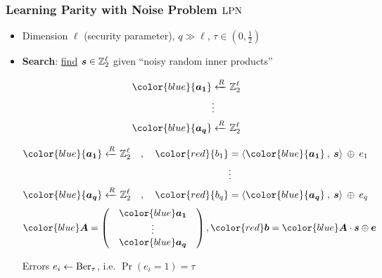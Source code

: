 \begin{frame}
\frametitle{Learning Parity with Noise Problem $\mathrm{LPN}$}
\begin{itemize}[<+->]
 \item Dimension $\ell$ (security parameter), $q \gg \ell$, $\tau \in \left( 0,\frac{1}{2} \right)$
 \vspace*{5pt}
 \item \textbf{Search}: \underline{find}  $ \boldsymbol{s} \in \mathbb{Z}_2^{\ell}$ given ``noisy random inner products'' \\
 \begin{overprint}
  \begin{align*}
  {\color{blue}{\vect{a_1}}} & \R \zol \quad   \\
   & \vdots \\
   {\color{blue}{\vect{a_q}}} & \R \zol \quad   \\
  \end{align*}


  \begin{align*}
  {\color{blue}{\vect{a_1}}} \R \zol \quad , \quad {\color{red}{b_1}} &= \langle {\color{blue}{\vect{a_1}}} \: , \: \vect{s} \rangle \: \xor \: e_1 \\
   & \vdots \\
   {\color{blue}{\vect{a_q}}} \R \zol \quad, \quad  {\color{red}{b_q}} &= \langle {\color{blue}{\vect{a_q}}} \: , \: \vect{s} \rangle \: \xor \: e_q \\
  \end{align*}
  \vspace*{15pt}
\[
{\color{blue} \vect{A}} = \begin{pmatrix}
            & {\color{blue}\vect{a_1}} & \\
            & \vdots  & \\ 
            & {\color{blue}\vect{a_q}} & 
           \end{pmatrix}  , {\color{red} \vect{b}} = {\color{blue} \vect{A}} \cdot \vect{s} \xor \vect{e} 
\]
 \end{overprint}
 Errors $e_i \gets \mathrm{Ber}_{\tau}$, i.e. $\Pr(e_i=1)= \tau$

 \end{itemize}
\vspace{5pt}


\end{frame}
